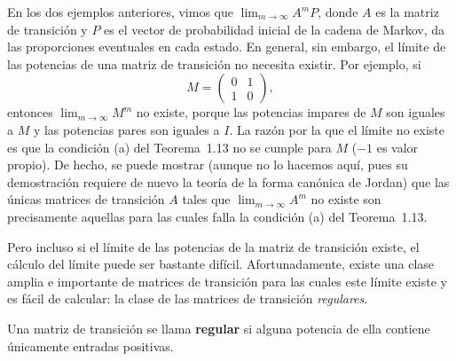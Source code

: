 \documentclass[12pt,a4paper]{book}
\begin{document}
    En los dos ejemplos anteriores, vimos que $\lim_{m\to\infty}A^mP$, donde $A$ es la matriz de transición y $P$ es el vector de probabilidad inicial de la cadena de Markov, da las proporciones eventuales en cada estado. En general, sin embargo, el límite de las potencias de una matriz de transición no necesita existir. Por ejemplo, si
    \begin{equation*}
        M=\begin{pmatrix}0&1\\1&0\end{pmatrix},
    \end{equation*}
    entonces $\lim_{m\to\infty}M^m$ no existe, porque las potencias impares de $M$ son iguales a $M$ y las potencias pares son iguales a $I$. La razón por la que el límite no existe es que la condición (a) del Teorema~1.13 no se cumple para $M$ ($-1$ es valor propio). De hecho, se puede mostrar (aunque no lo hacemos aquí, pues su demostración requiere de nuevo la teoría de la forma canónica de Jordan) que las únicas matrices de transición $A$ tales que $\lim_{m\to\infty}A^m$ no existe son precisamente aquellas para las cuales falla la condición (a) del Teorema~1.13.

    Pero incluso si el límite de las potencias de la matriz de transición existe, el cálculo del límite puede ser bastante difícil. Afortunadamente, existe una clase amplia e importante de matrices de transición para las cuales este límite existe y es fácil de calcular: la clase de las matrices de transición \textit{regulares}.

    \begin{definicion}
        Una matriz de transición se llama \textbf{regular} si alguna potencia de ella contiene únicamente entradas positivas.
    \end{definicion}
\end{document}
